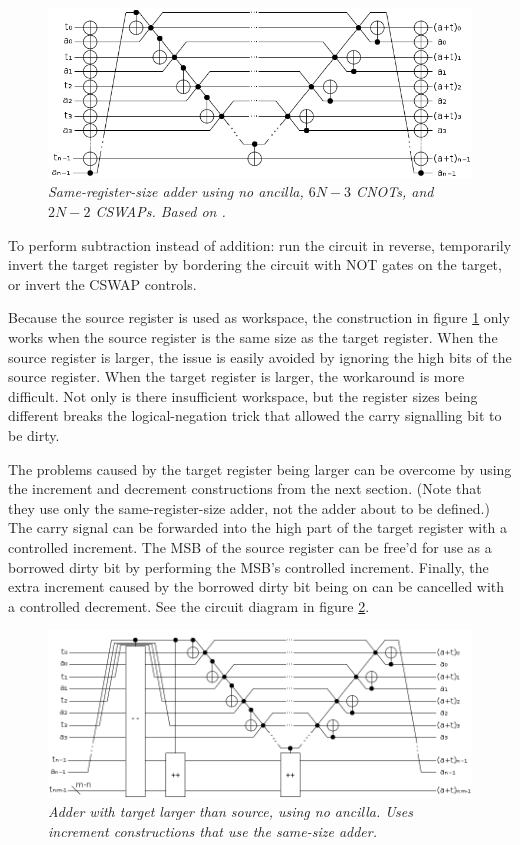 \documentclass[twocolumn]{article}
\begin{document}
\begin{figure}
  \centering
  \includegraphics[totalheight=3cm]{inline-adder.png}
  \caption{\em Same-register-size adder using no ancilla, $6N-3$ CNOTs, and $2N-2$ CSWAPs. Based on \cite{van2004}.}
  \label{fig:inlineadder}
\end{figure}

To perform subtraction instead of addition: run the circuit in reverse, temporarily invert the target register by bordering the circuit with NOT gates on the target, or invert the CSWAP controls.

Because the source register is used as workspace, the construction in figure \ref{fig:inlineadder} only works when the source register is the same size as the target register.
When the source register is larger, the issue is easily avoided by ignoring the high bits of the source register.
When the target register is larger, the workaround is more difficult.
Not only is there insufficient workspace, but the register sizes being different breaks the logical-negation trick that allowed the carry signalling bit to be dirty.

The problems caused by the target register being larger can be overcome by using the increment and decrement constructions from the next section.
(Note that they use only the same-register-size adder, not the adder about to be defined.)
The carry signal can be forwarded into the high part of the target register with a controlled increment.
The MSB of the source register can be free'd for use as a borrowed dirty bit by performing the MSB's controlled increment.
Finally, the extra increment caused by the borrowed dirty bit being on can be cancelled with a controlled decrement.
See the circuit diagram in figure \ref{fig:inline-adder-into-large}.

\begin{figure}
  \centering
  \includegraphics[totalheight=3cm]{inline-adder-into-large.png}
  \caption{\em
      Adder with target larger than source, using no ancilla.
      Uses increment constructions that use the same-size adder.}
  \label{fig:inline-adder-into-large}
\end{figure}
\end{document}
